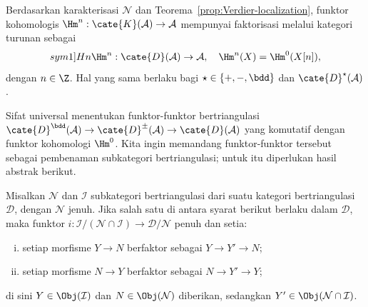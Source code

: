 Berdasarkan karakterisasi $\mathcal{N}$ dan
Teorema~\ref{prop:Verdier-localization}, funktor kohomologis
$\Hm^n: \cate{K}(\mathcal{A}) \to \mathcal{A}$ mempunyai faktorisasi melalui
kategori turunan sebagai
\begin{equation*}
	\index[sym1]{Hn}
	\Hm^n: \cate{D}(\mathcal{A}) \to \mathcal{A}, \quad \Hm^n(X) = \Hm^0(X[n]),
\end{equation*}
dengan $n \in \Z$. Hal yang sama berlaku bagi
$\star \in \{+, -, \bdd\}$ dan $\cate{D}^{\star}(\mathcal{A})$.

Sifat universal menentukan funktor-funktor bertriangulasi
$\cate{D}^{\bdd}(\mathcal{A}) \to \cate{D}^{\pm}(\mathcal{A}) \to
\cate{D}(\mathcal{A})$ yang komutatif dengan funktor kohomologi $\Hm^0$.
Kita ingin memandang funktor-funktor tersebut sebagai pembenaman subkategori
bertriangulasi; untuk itu diperlukan hasil abstrak berikut.

\begin{lema}\label{prop:N-D-full-faithful}
	Misalkan $\mathcal{N}$ dan $\mathcal{I}$ subkategori bertriangulasi dari
	suatu kategori bertriangulasi $\mathcal{D}$, dengan $\mathcal{N}$ jenuh.
	Jika salah satu di antara syarat berikut berlaku dalam $\mathcal{D}$, maka
	funktor
	$i: \mathcal{I}/(\mathcal{N} \cap \mathcal{I}) \to \mathcal{D}/\mathcal{N}$
	penuh dan setia:
	\begin{enumerate}[(i)]
		\item setiap morfisme $Y \to N$ berfaktor sebagai $Y \to Y' \to N$;
		\item setiap morfisme $N \to Y$ berfaktor sebagai $N \to Y' \to Y$;
	\end{enumerate}
	di sini $Y \in \Obj(\mathcal{I})$ dan $N \in \Obj(\mathcal{N})$ diberikan,
	sedangkan $Y' \in \Obj(\mathcal{N} \cap \mathcal{I})$.
\end{lema}

